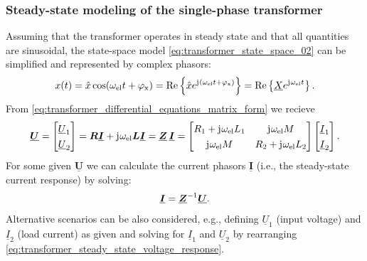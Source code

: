 \begin{frame}
	\frametitle{Steady-state modeling of the single-phase transformer}
		Assuming that the transformer operates in steady state and that all quantities are sinusoidal, the state-space model \eqref{eq:transformer_state_space_02} can be simplified and represented by complex phasors:
			$$x(t) = \hat{x} \cos(\omega_\mathrm{el} t+ \varphi_{\mathrm{x}}) = \mathrm{Re}\left\{\hat{x} e^{\mathrm{j}\mkern1mu (\omega_\mathrm{el} t + \varphi_{\mathrm{x}})}\right\}= \mathrm{Re}\left\{\underline{X} e^{\mathrm{j}\mkern1mu \omega_\mathrm{el} t}\right\}.$$
		From \eqref{eq:transformer_differential_equations_matrix_form} we recieve
		\begin{align}
			\bm{\underline{U}} = \begin{bmatrix} \underline{U}_1 \\ \underline{U}_2 \end{bmatrix} = \bm{R}\bm{\underline{I}} + \iu \omega_\mathrm{el} \bm{L}\bm{\underline{I}} = \bm{\underline{Z}}\, \bm{\underline{I} } = \begin{bmatrix} R_1 + \iu \omega_\mathrm{el} L_1 & \iu \omega_\mathrm{el} M \\ \iu \omega_\mathrm{el} M & R_2 + \iu \omega_\mathrm{el} L_2 \end{bmatrix} \begin{bmatrix} \underline{I}_1 \\ \underline{I}_2 \end{bmatrix}.
			\label{eq:transformer_steady_state_voltage_response}
		\end{align}
		For some given $\bm{\underline{U}}$ we can calculate the current phasors $\bm{\underline{I}}$ (i.e., the steady-state current response) by solving:
		\begin{align}
			\renewcommand*{\arraystretch}{1.3} 
			\bm{\underline{I}} = \bm{\underline{Z}}^{-1} \bm{\underline{U}} .
			\label{eq:transformer_steady_state_current_response}
		\end{align}
		Alternative scenarios can be also considered, e.g., defining $\underline{U}_1$ (input voltage) and $\underline{I}_2$ (load current) as given and solving for $\underline{I}_1$ and $\underline{U}_2$ by rearranging \eqref{eq:transformer_steady_state_voltage_response}. 
\end{frame}

